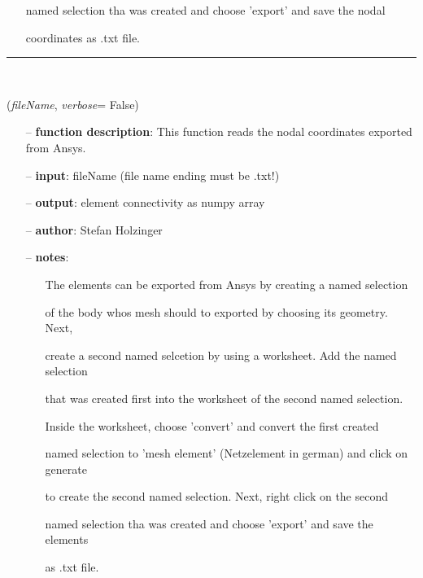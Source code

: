 \begin{itemize}[leftmargin=1.4cm]
\begin{itemize}[leftmargin=1.4cm]
\begin{itemize}[leftmargin=0.5cm]
\begin{itemize}[leftmargin=1.4cm]
\begin{itemize}[leftmargin=1.4cm]
\begin{itemize}[leftmargin=0.5cm]
\begin{itemize}[leftmargin=0.7cm]
\begin{itemize}[leftmargin=1.2cm]
\item[]named selection tha was created and choose 'export' and save the nodal
\item[]coordinates as .txt file.
\end{itemize}
\vspace{12pt}\end{itemize}
%
\noindent\rule{8cm}{0.75pt}\vspace{1pt} \\ 
\begin{flushleft}
\label{sec:FEM:ReadElementsFromAnsysTxt}
({\it fileName}, {\it verbose}= False)
\end{flushleft}
\setlength{\itemindent}{0.7cm}
\begin{itemize}[leftmargin=0.7cm]
\item[--]
{\bf function description}: This function reads the nodal coordinates exported from Ansys.
\item[--]
{\bf input}: fileName (file name ending must be .txt!)
\item[--]
{\bf output}: element connectivity as numpy array
\item[--]
{\bf author}: Stefan Holzinger
\item[--]
{\bf notes}: \vspace{-6pt}
\begin{itemize}[leftmargin=1.2cm]
\setlength{\itemindent}{-0.7cm}
\item[]The elements can be exported from Ansys by creating a named selection
\item[]of the body whos mesh should to exported by choosing its geometry. Next,
\item[]create a second named selcetion by using a worksheet. Add the named selection
\item[]that was created first into the worksheet of the second named selection.
\item[]Inside the worksheet, choose 'convert' and convert the first created
\item[]named selection to 'mesh element' (Netzelement in german) and click on generate
\item[]to create the second named selection. Next, right click on the second
\item[]named selection tha was created and choose 'export' and save the elements
\item[]as .txt file.
\end{itemize}

\end{itemize}
\end{itemize}
\end{itemize}
\end{itemize}
\end{itemize}
\end{itemize}
\end{itemize}

